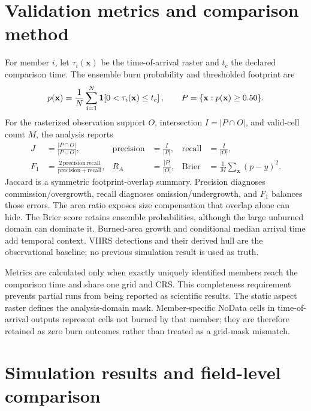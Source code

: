 \section{Validation metrics and comparison method}

For member $i$, let $\tau_i(\mathbf{x})$ be the time-of-arrival raster and $t_c$
the declared comparison time.  The ensemble burn probability and thresholded
footprint are
\begin{equation}
 p(\mathbf{x})=\frac{1}{N}\sum_{i=1}^{N}
 \mathbf{1}\!\left[0<\tau_i(\mathbf{x})\le t_c\right],\qquad
 P=\{\mathbf{x}:p(\mathbf{x})\ge0.50\}.
\end{equation}
For the rasterized observation support $O$, intersection $I=|P\cap O|$, and
valid-cell count $M$, the analysis reports
\begin{align}
 J&=\frac{|P\cap O|}{|P\cup O|}, &
 \mathrm{precision}&=\frac{I}{|P|}, &
 \mathrm{recall}&=\frac{I}{|O|},\\
 F_1&=\frac{2\,\mathrm{precision}\,\mathrm{recall}}
 {\mathrm{precision}+\mathrm{recall}}, &
 R_A&=\frac{|P|}{|O|}, &
 \mathrm{Brier}&=\frac{1}{M}\sum_{\mathbf{x}}(p-y)^2.
\end{align}
Jaccard is a symmetric footprint-overlap summary.  Precision diagnoses
commission/overgrowth, recall diagnoses omission/undergrowth, and $F_1$ balances
those errors.  The area ratio exposes size compensation that overlap alone can
hide.  The Brier score retains ensemble probabilities, although the large
unburned domain can dominate it.  Burned-area growth and conditional median
arrival time add temporal context.  VIIRS detections and their derived hull are
the observational baseline; no previous simulation result is used as truth.

Metrics are calculated only when exactly \EnsembleSize{} uniquely identified
members reach the comparison time and share one grid and CRS.  This completeness
requirement prevents partial runs from being reported as scientific results.
The static aspect raster defines the analysis-domain mask.  Member-specific
NoData cells in time-of-arrival outputs represent cells not burned by that
member; they are therefore retained as zero burn outcomes rather than treated
as a grid-mask mismatch.

\section{Simulation results and field-level comparison}

